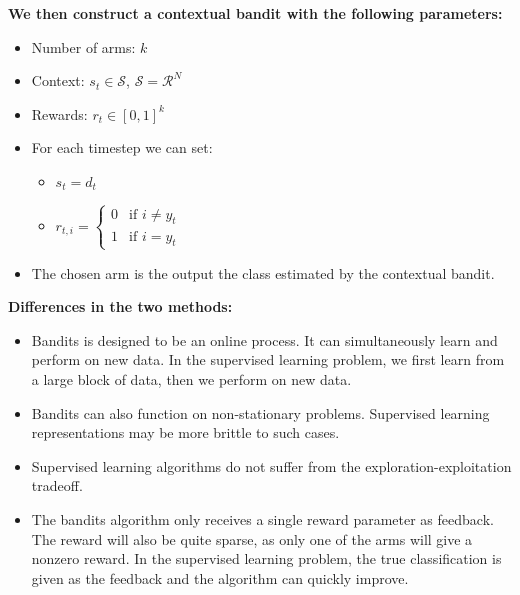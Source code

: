 \documentclass[addpoints,12pt,solution]{exam}
\begin{document}
\begin{questions}
\begin{solution}
            \textbf{We then construct a contextual bandit with the following parameters:}
            \begin{itemize}
                \item Number of arms: $k$
                \item Context: $s_t \in \mathcal{S}$, $\mathcal{S} = \mathcal{R}^N$
                \item Rewards: $r_t \in [0, 1]^k$
                \item For each timestep we can set:
                \begin{itemize}
                    \item $s_t = d_t$
                    \item $r_{t, i} = \left\{ \begin{matrix}
                                                  0 & \text{if }i \neq y_t \\
                                                  1 & \text{if }i = y_t
                    \end{matrix}\right.\, $
                \end{itemize}
                \item The chosen arm is the output the class estimated by the contextual bandit.
            \end{itemize}


            \textbf{Differences in the two methods:}
            \begin{itemize}
                \item Bandits is designed to be an online process.
                It can simultaneously learn and perform on new data.
                In the supervised learning problem, we first learn from a large block of data, then we perform on new data.
                \item Bandits can also function on non-stationary problems.
                Supervised learning representations may be more brittle to such cases.
                \item Supervised learning algorithms do not suffer from the exploration-exploitation tradeoff.
                \item The bandits algorithm only receives a single reward parameter as feedback.
                The reward will also be quite sparse, as only one of the arms will give a nonzero reward.
                In the supervised learning problem, the true classification is given as the feedback and the algorithm can quickly improve.


\end{itemize}
\end{solution}
\end{questions}
\end{document}
